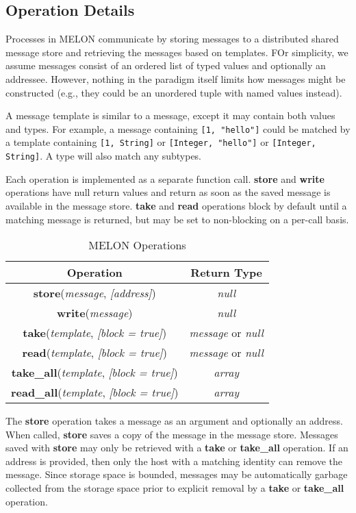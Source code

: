 \subsection{Operation Details}

Processes in MELON communicate by storing messages to a distributed shared message store and retrieving the messages based on templates. FOr simplicity, we assume messages consist of an ordered list of typed values and optionally an addressee. However, nothing in the paradigm itself limits how messages might be constructed (e.g., they could be an unordered tuple with named values instead).

A message template is similar to a message, except it may contain both values and types. For example, a message containing \texttt{[1, "hello"]} could be matched by a template containing \texttt{[1, String]} or \texttt{[Integer, "hello"]} or \texttt{[Integer, String]}. A type will also match any subtypes.

Each operation is implemented as a separate function call. \textbf{store} and \textbf{write} operations have null return values and return as soon as the saved message is available in the message store. \textbf{take} and \textbf{read} operations block by default until a matching message is returned, but may be set to non-blocking on a per-call basis.

\begin{table}
\centering
\begin{tabular}{|c|c|}
\hline
\textbf{Operation} & \textbf{Return Type} \\ \hline
\textbf{store}(\textit{message}, \textit{[address]}) & \textit{null} \\ \hline
\textbf{write}(\textit{message}) & \textit{null} \\ \hline
\textbf{take}(\textit{template}, \textit{[block = true]}) & \textit{message} or \textit{null} \\ \hline
\textbf{read}(\textit{template}, \textit{[block = true]}) & \textit{message} or \textit{null} \\ \hline
\textbf{take\_all}(\textit{template}, \textit{[block = true]}) & \textit{array} \\ \hline
\textbf{read\_all}(\textit{template}, \textit{[block = true]}) & \textit{array} \\ \hline
\end{tabular}
\caption{MELON Operations}
\end{table}

The \textbf{store} operation takes a message as an argument and optionally an address. When called, \textbf{store} saves a copy of the message in the message store. Messages saved with \textbf{store} may only be retrieved with a \textbf{take} or \textbf{take\_all} operation. If an address is provided, then only the host with a matching identity can remove the message. Since storage space is bounded, messages may be automatically garbage collected from the storage space prior to explicit removal by a \textbf{take} or \textbf{take\_all} operation.

